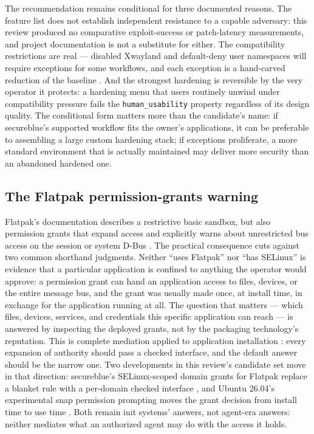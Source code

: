 \documentclass[
  english,
  9pt,
]{extarticle}
\begin{document}
The recommendation remains conditional for three documented reasons. The
feature list does not establish independent resistance to a capable
adversary: this review produced no comparative exploit-success or
patch-latency measurements, and project documentation is not a
substitute for either. The compatibility restrictions are real ---
disabled Xwayland and default-deny user namespaces will require
exceptions for some workflows, and each exception is a hand-carved
reduction of the baseline \citep{secureblue_v430}. And the strongest
hardening is reversible by the very operator it protects: a hardening
menu that users routinely unwind under compatibility pressure fails the
\texttt{human\_usability} property regardless of its design quality. The
conditional form matters more than the candidate's name: if secureblue's
supported workflow fits the owner's applications, it can be preferable
to assembling a large custom hardening stack; if exceptions proliferate,
a more standard environment that is actually maintained may deliver more
security than an abandoned hardened one.

\subsection{The Flatpak permission-grants
warning}\label{the-flatpak-permission-grants-warning}

Flatpak's documentation describes a restrictive basic sandbox, but also
permission grants that expand access and explicitly warns about
unrestricted bus access on the session or system D-Bus
\citep{flatpak_permissions}. The practical consequence cuts against two
common shorthand judgments. Neither ``uses Flatpak'' nor ``has SELinux''
is evidence that a particular application is confined to anything the
operator would approve: a permission grant can hand an application
access to files, devices, or the entire message bus, and the grant was
usually made once, at install time, in exchange for the application
running at all. The question that matters --- which files, devices,
services, and credentials this specific application can reach --- is
answered by inspecting the deployed grants, not by the packaging
technology's reputation. This is complete mediation applied to
application installation \citep{saltzer1975}: every expansion of
authority should pass a checked interface, and the default answer should
be the narrow one. Two developments in this review's candidate set move
in that direction: secureblue's SELinux-scoped domain grants for Flatpak
replace a blanket rule with a per-domain checked interface
\citep{secureblue_v430}, and Ubuntu 26.04's experimental snap permission
prompting moves the grant decision from install time to use time
\citep{ubuntu_2604_security}. Both remain init systems' answers, not
agent-era answers: neither mediates what an authorized agent may do with
the access it holds.
\end{document}

